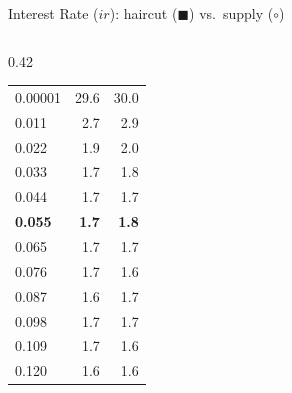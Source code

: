 \documentclass[aspectratio=169,10pt]{beamer}
\begin{document}
\begin{frame}{Interest Rate ($ir$): haircut ($\blacksquare$) vs.\ supply ($\circ$)}
\begin{columns}[T]
\begin{column}{0.42\textwidth}
\begin{tabular}{lrr}
        \midrule
        0.00001 & 29.6 & 30.0 \\
        0.011 & 2.7 & 2.9 \\
        0.022 & 1.9 & 2.0 \\
        0.033 & 1.7 & 1.8 \\
        0.044 & 1.7 & 1.7 \\
        \textbf{0.055} & \textbf{1.7} & \textbf{1.8} \\
        0.065 & 1.7 & 1.7 \\
        0.076 & 1.7 & 1.6 \\
        0.087 & 1.6 & 1.7 \\
        0.098 & 1.7 & 1.7 \\
        0.109 & 1.7 & 1.6 \\
        0.120 & 1.6 & 1.6 \\
        \bottomrule
      \end{tabular}
    \end{column}
  \end{columns}
\end{frame}
\end{document}
